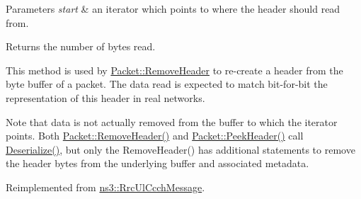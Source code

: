 \begin{DoxyParams}{Parameters}
{\em start} & an iterator which points to where the header should read from. \\
\hline
\end{DoxyParams}
\begin{DoxyReturn}{Returns}
the number of bytes read.
\end{DoxyReturn}
This method is used by \hyperlink{classns3_1_1Packet_a0961eccf975d75f902d40956c93ba63e}{Packet\+::\+Remove\+Header} to re-\/create a header from the byte buffer of a packet. The data read is expected to match bit-\/for-\/bit the representation of this header in real networks.

Note that data is not actually removed from the buffer to which the iterator points. Both \hyperlink{classns3_1_1Packet_a0961eccf975d75f902d40956c93ba63e}{Packet\+::\+Remove\+Header()} and \hyperlink{classns3_1_1Packet_aadc63487bea70945c418f4c3e9b81964}{Packet\+::\+Peek\+Header()} call \hyperlink{classns3_1_1RrcConnectionReestablishmentRequestHeader_a912a20fb879046a7c61a8f5124e6b809}{Deserialize()}, but only the Remove\+Header() has additional statements to remove the header bytes from the underlying buffer and associated metadata. 

Reimplemented from \hyperlink{classns3_1_1RrcUlCcchMessage_a61b96b11357e6e34d48a3ec1b7d31a38}{ns3\+::\+Rrc\+Ul\+Ccch\+Message}.


